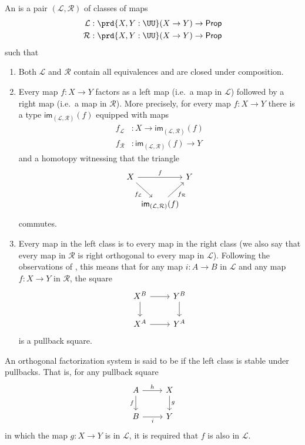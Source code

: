 \documentclass{msc}
\begin{document}
\begin{defn}
  An  is a pair $(\mathcal{L},\mathcal{R})$ of classes of maps
  \begin{align*}
    \mathcal{L} & : \prd{X,Y:\UU} (X \to Y) \to \mathsf{Prop} \\
    \mathcal{R} & : \prd{X,Y:\UU} (X \to Y) \to \mathsf{Prop} 
  \end{align*}
  such that
  \begin{enumerate}
  \item Both $\mathcal{L}$ and $\mathcal{R}$ contain all equivalences and are closed under composition.
  \item Every map $f:X\to Y$ factors as a left map (i.e.~a map in $\mathcal{L}$) followed by a right map (i.e.~a map in $\mathcal{R}$). More precisely, for every map $f:X\to Y$ there is a type $\mathsf{im}_{(\mathcal{L},\mathcal{R})}(f)$ equipped with maps
    \begin{align*}
      f_{\mathcal{L}} & :X\to \mathsf{im}_{(\mathcal{L},\mathcal{R})}(f)\\
      f_{\mathcal{R}} & :\mathsf{im}_{(\mathcal{L},\mathcal{R})}(f) \to Y
    \end{align*}
    and a homotopy witnessing that the triangle
    \begin{equation*}
      \begin{tikzcd}[column sep=0]
        X \arrow[rr,"f"] \arrow[dr,swap,"f_{\mathcal{L}}"] & & Y \\
        & \mathsf{im}_{(\mathcal{L},\mathcal{R})}(f) \arrow[ur,swap,"f_{\mathcal{R}}"]
      \end{tikzcd}
    \end{equation*}
    commutes.
  \item Every map in the left class is  to every map in the right class (we also say that every map in $\mathcal{R}$ is right orthogonal to every map in $\mathcal{L}$). Following the observations of \cite{AnelBiedermanFinsterJoyal}, this means that for any map $i:A \to B$ in $\mathcal{L}$ and any map $f:X \to Y$ in $\mathcal{R}$, the square
    \begin{equation*}
      \begin{tikzcd}
        X^B \arrow[r] \arrow[d] & Y^B \arrow[d] \\
        X^A \arrow[r] & Y^A
      \end{tikzcd}
    \end{equation*}
    is a pullback square.
  \end{enumerate}
  An orthogonal factorization system is said to be  if the left class is stable under pullbacks. That is, for any pullback square
  \begin{equation*}
    \begin{tikzcd}
      A \arrow[r,"h"] \arrow[d,swap,"f"] & X \arrow[d,"g"] \\
      B \arrow[r,swap,"i"] & Y
    \end{tikzcd}
  \end{equation*}
  in which the map $g:X \to Y$ is in $\mathcal{L}$, it is required that $f$ is also in $\mathcal{L}$.
\end{defn}
\end{document}
